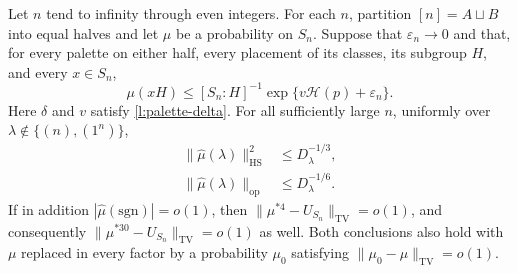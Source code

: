 \begin{theorem}
\label{l:palette-transfer}
Let $n$ tend to infinity through even integers.  For each $n$, partition
$[n]=A\sqcup B$ into equal halves and let $\mu$ be a probability on
$S_n$.  Suppose that $\varepsilon_n\to0$ and that, for every palette
on either half, every placement of its classes, its subgroup $H$, and
every $x\in S_n$,
\begin{equation}
 \mu(xH)\le [S_n:H]^{-1}
            \exp\{v\mathcal H(p)+\varepsilon_n\}.
 \label{l:palette-transfer-hyp}
\end{equation}
Here $\delta$ and $v$ satisfy \eqref{l:palette-delta}.  For all
sufficiently large $n$, uniformly over
$\lambda\notin\{(n),(1^n)\}$,
\begin{align}
 \|\widehat\mu(\lambda)\|_{\mathrm{HS}}^2
 &\le D_\lambda^{-1/3},\label{l:palette-fourier-hs}\\
 \|\widehat\mu(\lambda)\|_{\mathrm{op}}
 &\le D_\lambda^{-1/6}.
 \label{l:palette-fourier}
\end{align}
If in addition $|\widehat\mu(\mathrm{sgn})|=o(1)$, then
$\|\mu^{*4}-U_{S_n}\|_{\mathrm{TV}}=o(1)$, and consequently
$\|\mu^{*30}-U_{S_n}\|_{\mathrm{TV}}=o(1)$ as well.
Both conclusions also hold with $\mu$ replaced in every factor
by a probability $\mu_0$ satisfying
$\|\mu_0-\mu\|_{\mathrm{TV}}=o(1)$.
\end{theorem}

